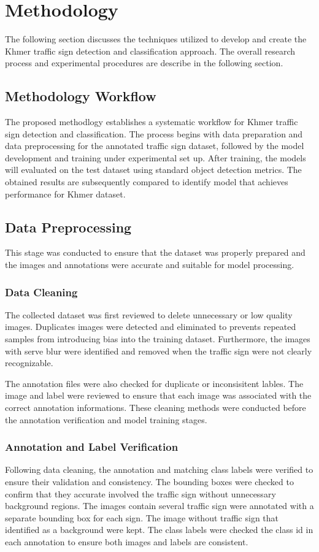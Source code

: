 \section{Methodology}
The following section discusses the techniques utilized to develop and create the Khmer traffic sign detection and classification approach.
The overall research process and experimental procedures are describe in the following section.
\subsection{Methodology Workflow}
The proposed methodlogy establishes a systematic workflow for Khmer traffic sign detection and classification.
The process begins with data preparation and data preprocessing for the annotated traffic sign dataset, followed by the model development
and training under experimental set up. After training, the models will evaluated on the test dataset using standard object detection metrics.
The obtained results are subsequently compared to identify model that achieves performance for Khmer dataset. 
\subsection{Data Preprocessing}
This stage was conducted to ensure that the dataset was properly prepared and the images and annotations were accurate and suitable for model processing.
\subsubsection{Data Cleaning}
The collected dataset was first reviewed to delete unnecessary or low quality images. Duplicates images were detected and eliminated to prevents repeated samples
from introducing bias into the training dataset. Furthermore, the images with serve blur were identified and removed when the traffic sign were not clearly recognizable.

The annotation files were also checked for duplicate or inconsisitent lables. The image and label were reviewed to ensure that each image was associated with the correct
annotation informations. These cleaning methods were conducted before the annotation verification and model training stages.
\subsubsection{Annotation and Label Verification}
Following data cleaning, the annotation and matching class labels were verified to ensure their validation and consistency. The bounding boxes were checked to confirm that they accurate involved the traffic sign 
without unnecessary background regions. The images contain several traffic sign were annotated with a separate bounding box for each sign. The image without traffic sign that identified as a background were kept. 
The class labels were checked the class id in each annotation to ensure both images and labels are consistent.
